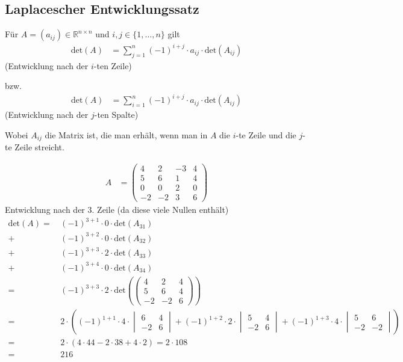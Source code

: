 \subsection{Laplacescher Entwicklungssatz}

Für $A = (a_{ij}) \in \mathbb{R}^{n \times n}$ und $i, j \in \{1,\dots,n\}$ gilt
\begin{align*}
	\text{det}(A) &= \sum_{j=1}^{n}(-1)^{i+j} \cdot a_{ij} \cdot \text{det}(A_{ij})
\end{align*}
(Entwicklung nach der $i$-ten Zeile)

bzw.
\begin{align*}
	\text{det}(A) &= \sum_{i=1}^{n}(-1)^{i+j} \cdot a_{ij} \cdot \text{det}(A_{ij})
\end{align*}
(Entwicklung nach der $j$-ten Spalte)

Wobei $A_{ij}$ die Matrix ist, die man erhält, wenn man in $A$ die $i$-te Zeile und die $j$-te Zeile streicht.

\begin{align*}
	A &= \begin{pmatrix}
		4 & 2 & -3 & 4 \\
		5 & 6 & 1 & 4 \\
		0 & 0 & 2 & 0 \\
		-2 & -2 &3 & 6
	\end{pmatrix}
\end{align*}
Entwicklung nach der 3. Zeile (da diese viele Nullen enthält)
\begin{align*}
	\text{det}(A) =\,&(-1)^{3+1} \cdot 0 \cdot \text{det}(A_{31}) \\
	+\,&(-1)^{3+2} \cdot 0 \cdot \text{det}(A_{32}) \\
	+\,&(-1)^{3+3} \cdot 2 \cdot \text{det}(A_{33}) \\
	+\,&(-1)^{3+4} \cdot 0 \cdot \text{det}(A_{34}) \\
	=\,&(-1)^{3+3} \cdot 2 \cdot \text{det}\left(\begin{pmatrix}
		4 & 2 & 4 \\
		5 & 6 & 4 \\
		-2 & -2 & 6
	\end{pmatrix}\right) \\
	=\,&2\cdot\left((-1)^{1+1} \cdot 4 \cdot \begin{vmatrix}
		6 & 4 \\
		-2 & 6
	\end{vmatrix} + (-1)^{1+2} \cdot 2 \cdot \begin{vmatrix}
		5 & 4 \\
		-2 & 6
	\end{vmatrix} + (-1)^{1+3} \cdot 4 \cdot \begin{vmatrix}
		5 & 6 \\
		-2 & -2
	\end{vmatrix}\right) \\
	=\,&2 \cdot (4 \cdot 44 - 2 \cdot 38 + 4 \cdot 2) = 2 \cdot 108 \\
	=\,&216
\end{align*}

